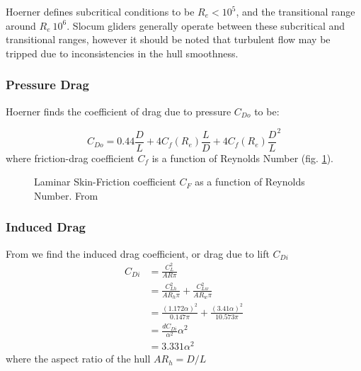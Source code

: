 \documentclass[10pt]{article}
\begin{document}
Hoerner \cite[pg. 6-16]{Hoerner:1964} defines subcritical conditions to be $R_e < 10^5$, and the transitional range around $R_e ~ 10^6$.  Slocum gliders generally operate between these subcritical and transitional ranges, however it should be noted that turbulent flow may be tripped due to inconsistencies in the hull smoothness.  


\subsubsection{Pressure Drag}

Hoerner \cite[pg. 3-12]{Hoerner:1964} finds the coefficient of drag due to pressure $C_{Do}$ to be:

\begin{equation}\label{eq:Cdo_312}
C_{Do} = 0.44\frac{D}{L}+4C_f(R_e)\frac{L}{D}+4C_f(R_e)  \frac{D}{L}^2
\end{equation}
where friction-drag coefficient $C_f$ is a function of Reynolds Number (fig. \ref{fig:Cf}).  


      \begin{figure}[htb]
        \caption{\label{fig:Cf} Laminar Skin-Friction coefficient $C_F$ as a function of Reynolds Number.  From \cite[pg. 6-16]{Hoerner:1964} }
      \end{figure}

\subsubsection{Induced Drag}
From \cite[pg. 7-2]{Hoerner:1964} we find the induced drag coefficient, or drag due to lift $C_{Di}$ 
\begin{align}
C_{Di} &= \frac{C_L^2}{AR\pi}\\
&=\frac{C_{Lh}^2}{AR_h\pi }+\frac{C_{Lw}^2}{AR_w \pi }\\
&=\frac{(1.172\alpha)^2}{0.147\pi}+\frac{(3.41\alpha)^2}{10.573\pi}\\
&=\frac{dC_{Di}}{\alpha^2}\alpha^2\\
&=3.331\alpha^2
\end{align}
where the aspect ratio of the hull $AR_h=D/L$ 
\end{document}
